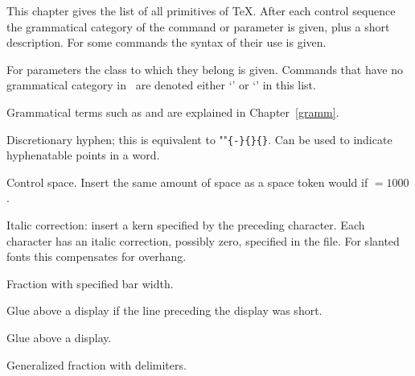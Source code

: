 
This chapter gives the list of all primitives of
\TeX. After each control sequence
the grammatical category of the command or parameter
is given, plus a short description. For some  commands
the syntax of their use is given.

For parameters the class to which they belong is given.
Commands that have no grammatical category
in \TeXbook\ are denoted either
`' or
`' in this list.

Grammatical terms such as  and 
are explained in Chapter~\ref{gramm}.

\begin{glossinventory}

\item []\par

\item [\cs{-}]
      Discretionary hyphen; this is
      equivalent to ""\verb|{-}{}{}|.
      Can be used to indicate hyphenatable points in a word. 

\item [\cs{char32}]
      Control space.
      Insert the same amount of space as a space token would
 \alt
      if ${}=1000$.

\item [\cs{char47}]
      Italic correction: insert a kern specified by the
      preceding character.
      Each character has an italic correction, possibly zero,
      specified in the  file.
      For slanted fonts this compensates for overhang.

\item [\cs{above\gr{dimen}}]
      Fraction with specified bar width. 

\item [\cs{abovedisplayshortskip}]
      Glue above a display if the line preceding the display was short.

\item [\cs{abovedisplayskip}]
      Glue above a display.

\item [\cs{abovewithdelims\gr{delim$_1$}\gr{delim$_2$}\gr{dimen}}]
      Generalized fraction with delimiters.


\end{glossinventory}
